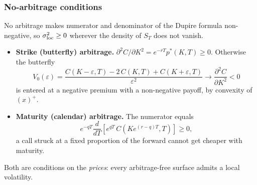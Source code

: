 \begin{frame}
\frametitle{No-arbitrage conditions}
\begin{scriptsize}
No arbitrage makes numerator and denominator of the Dupire formula non-negative,
so $\sigma_{\mathrm{loc}}^2 \geq 0$ wherever the density of $S_T$ does not vanish.
\begin{itemize}
\item \textbf{Strike (butterfly) arbitrage.}
$\partial^2 C / \partial K^2 = e^{-rT} p^*(K,T) \geq 0$.
Otherwise the butterfly
\begin{equation*}
    V_0(\varepsilon)
        = \frac{C(K-\varepsilon, T) - 2\,C(K, T) + C(K+\varepsilon, T)}{\varepsilon^2}
        \longrightarrow \frac{\partial^2 C}{\partial K^2} < 0
\end{equation*}
is entered at a negative premium with a non-negative payoff, by convexity of $(x)^+$.

\item \textbf{Maturity (calendar) arbitrage.}
The numerator equals
\begin{equation*}
    e^{-qT}\frac{d}{dT}\!\left[e^{qT}\,C\!\left(K e^{(r-q)T}, T\right)\right] \geq 0,
\end{equation*}
a call struck at a fixed proportion of the forward cannot get cheaper with maturity.
\end{itemize}
\medskip
Both are conditions on the \emph{prices}: every arbitrage-free surface admits a local volatility.
\end{scriptsize}
\end{frame}

